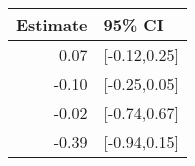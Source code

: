 \begin{tabular}{rl}
  \hline
Estimate & 95\% CI \\ 
  \hline
0.07 & [-0.12,0.25] \\ 
  -0.10 & [-0.25,0.05] \\ 
  -0.02 & [-0.74,0.67] \\ 
  -0.39 & [-0.94,0.15] \\ 
   \hline
\end{tabular}


